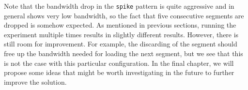 Note that the bandwidth drop in the \texttt{spike} pattern is quite aggressive and in general shows very low bandwidth, so the fact that five consecutive segments are dropped is somehow expected. As mentioned in previous sections, running the experiment multiple times results in slightly different results. However, there is still room for improvement. For example, the discarding of the segment should free up the bandwidth needed for loading the next segment, but we see that this is not the case with this particular configuration. In the final chapter, we will propose some ideas that might be worth investigating in the future to further improve the solution.


